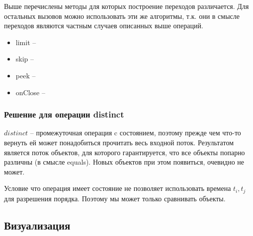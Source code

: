 Выше перечислены методы для которых построение переходов различается. Для остальных вызовов можно использовать эти же алгоритмы, т.к. они в смысле переходов являются частным случаев описанных выше операций.
\begin{itemize}
	\item limit --
	\item skip --
	\item peek --
	\item onClose -- 
\end{itemize}  


\subsubsection{Решение для операции distinct}
$distinct$ -- промежуточная операция c состоянием, поэтому прежде чем что-то вернуть ей может понадобиться прочитать весь входной поток. Результатом является поток объектов, для которого гарантируется, что все объекты попарно различны (в смысле equals\cite{java:equals}). Новых объектов при этом появиться, очевидно не может.

Условие что операция имеет состояние не позволяет использовать времена $t_i, t_j$ для разрешения порядка. Поэтому мы может только сравнивать объекты. 

\subsection{Визуализация}


